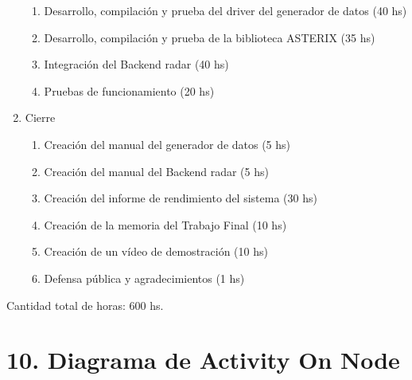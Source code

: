 \documentclass[
11pt, %
]{charter}
\begin{document}
\begin{enumerate}
\begin{enumerate}
	\item Desarrollo, compilación y prueba del driver del generador de datos (40 hs)
	\item Desarrollo, compilación y prueba de la biblioteca ASTERIX (35 hs)
	\item Integración del Backend radar (40 hs)
	\item Pruebas de funcionamiento (20 hs)
	\end{enumerate}
\item Cierre
	\begin{enumerate}
	\item Creación del manual del generador de datos (5 hs)
	\item Creación del manual del Backend radar (5 hs)
	\item Creación del informe de rendimiento del sistema (30 hs)
	\item Creación de la memoria del Trabajo Final (10 hs)
	\item Creación de un vídeo de demostración (10 hs)
	\item Defensa pública y agradecimientos (1 hs)
	\end{enumerate}
\end{enumerate}

Cantidad total de horas: 600 hs.


\section{10. Diagrama de Activity On Node}
\label{sec:AoN}
\end{document}
